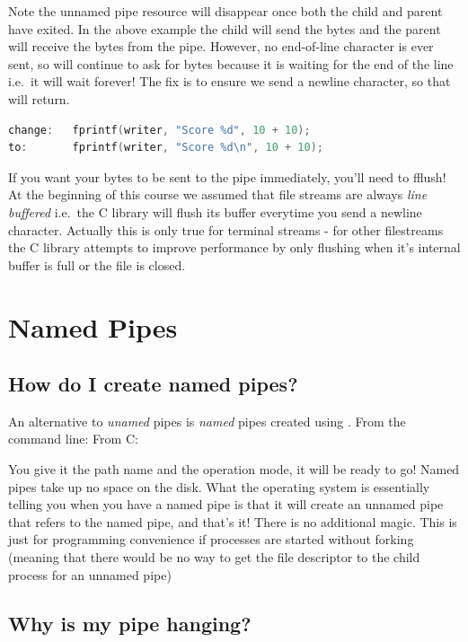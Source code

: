 Note the unnamed pipe resource will disappear once both the child and parent have exited. In the above example the child will send the bytes and the parent will receive the bytes from the pipe. However, no end-of-line character is ever sent, so  will continue to ask for bytes because it is waiting for the end of the line i.e.~it will wait forever! The fix is to ensure we send a newline character, so that  will return.

\begin{lstlisting}[language=C]
change:   fprintf(writer, "Score %d", 10 + 10);
to:       fprintf(writer, "Score %d\n", 10 + 10);
\end{lstlisting}

If you want your bytes to be sent to the pipe immediately, you'll need to fflush! At the beginning of this course we assumed that file streams are always \emph{line buffered} i.e.~the C library will flush its buffer everytime you send a newline character. Actually this is only true for terminal streams - for other filestreams the C library attempts to improve performance by only flushing when it's internal buffer is full or the file is closed.


\section{Named Pipes}\label{named-pipes}

\subsection{How do I create named pipes?}\label{how-do-i-create-named-pipes}

An alternative to \emph{unamed} pipes is \emph{named} pipes created using . From the command line:  From C: 

You give it the path name and the operation mode, it will be ready to go! Named pipes take up no space on the disk. What the operating system is essentially telling you when you have a named pipe is that it will create an unnamed pipe that refers to the named pipe, and that's it! There is no additional magic. This is just for programming convenience if processes are started without forking (meaning that there would be no way to get the file descriptor to the child process for an unnamed pipe)

\subsection{Why is my pipe hanging?}

